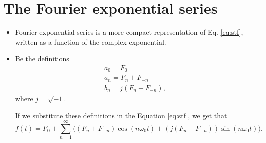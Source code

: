 \section{The Fourier exponential series}
\begin{itemize}
\item Fourier exponential series is a more compact representation of
  Eq. \ref{eq:stf}, written as a function of the complex exponential.
\item Be the definitions
\begin{equation}
\begin{array}{l}
  a_0 = F_0\\
  a_n = F_{n}+F_{-n}\\
  b_n = j(F_{n}-F_{-n}),
\end{array}
\tag{defs\_Fes}
\label{eq:defs_sef}
\end{equation}
where $j=\sqrt{-1}$.

If we substitute these definitions in the Equation \ref{eq:stf},
we get that
\begin{displaymath}
f(t) = F_0 + \sum_{n=1}^\infty \big((F_{n}+F_{-n}) \cos(n\omega_0t) +
   (j(F_{n}-F_{-n})) \sin(n\omega_0t)\big).
\end{displaymath}
\newpage


\end{itemize}
